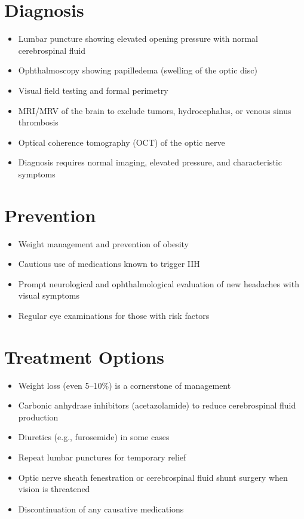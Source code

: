 \section{Diagnosis}
\begin{itemize}[noitemsep]
  \item Lumbar puncture showing elevated opening pressure with normal cerebrospinal fluid
  \item Ophthalmoscopy showing papilledema (swelling of the optic disc)
  \item Visual field testing and formal perimetry
  \item MRI/MRV of the brain to exclude tumors, hydrocephalus, or venous sinus thrombosis
  \item Optical coherence tomography (OCT) of the optic nerve
  \item Diagnosis requires normal imaging, elevated pressure, and characteristic symptoms
\end{itemize}
\section{Prevention}
\begin{itemize}[noitemsep]
  \item Weight management and prevention of obesity
  \item Cautious use of medications known to trigger IIH
  \item Prompt neurological and ophthalmological evaluation of new headaches with visual symptoms
  \item Regular eye examinations for those with risk factors
\end{itemize}
\section{Treatment Options}
\begin{itemize}[noitemsep]
  \item Weight loss (even 5--10\%) is a cornerstone of management
  \item Carbonic anhydrase inhibitors (acetazolamide) to reduce cerebrospinal fluid production
  \item Diuretics (e.g., furosemide) in some cases
  \item Repeat lumbar punctures for temporary relief
  \item Optic nerve sheath fenestration or cerebrospinal fluid shunt surgery when vision is threatened
  \item Discontinuation of any causative medications
\end{itemize}
